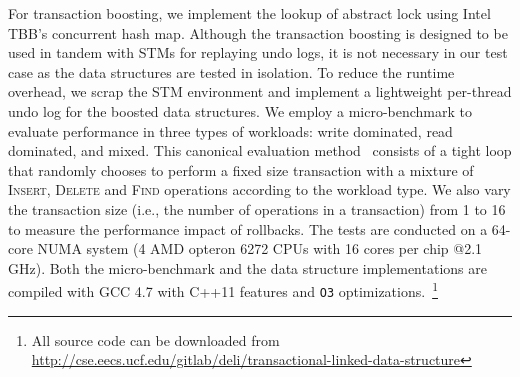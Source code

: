 \documentclass{sig-alternate-05-2015}
\begin{document}
For transaction boosting, we implement the lookup of abstract lock using Intel TBB's concurrent hash map.
Although the transaction boosting is designed to be used in tandem with STMs for replaying undo logs, it is not necessary in our test case as the data structures are tested in isolation.
To reduce the runtime overhead, we scrap the STM environment and implement a lightweight per-thread undo log for the boosted data structures.
We employ a micro-benchmark to evaluate performance in three types of workloads: write dominated, read dominated, and mixed.
This canonical evaluation method~\cite{dalessandro2010norec,harris2001pragmatic} consists of a tight loop that randomly chooses to perform a fixed size transaction with a mixture of \textsc{Insert}, \textsc{Delete} and \textsc{Find} operations according to the workload type.
We also vary the transaction size (i.e., the number of operations in a transaction) from 1 to 16 to measure the performance impact of rollbacks.
The tests are conducted on a 64-core NUMA system (4 AMD opteron 6272 CPUs with 16 cores per chip @2.1 GHz). 
Both the micro-benchmark and the data structure implementations are compiled with GCC 4.7 with C++11 features and \texttt{O3} optimizations.~\footnote{All source code can be downloaded from \url{http://cse.eecs.ucf.edu/gitlab/deli/transactional-linked-data-structure}}
\end{document}
